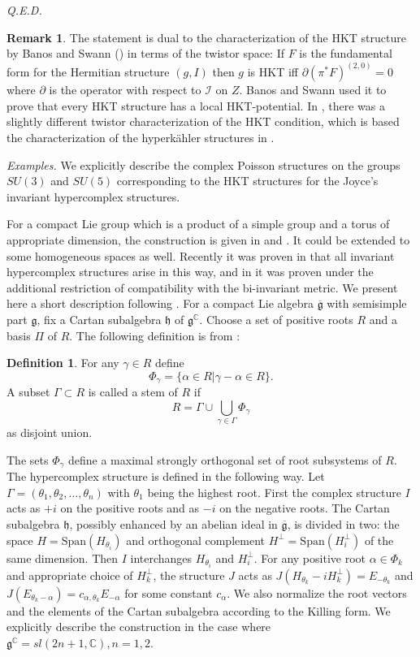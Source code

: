 \documentclass[11pt,oneside,leqno]{amsart}
\theoremstyle{plain}
\theoremstyle{definition}
\newtheorem{definition}[theorem]{Definition}
\newtheorem{rem}[theorem]{Remark}
\begin{document}
{\it Q.E.D.}

 \begin{rem} The statement is dual to the characterization of the HKT structure by Banos and Swann (\cite{BS}) in terms of the twistor space: If $F$ is the fundamental form for the Hermitian structure  $(g,I)$ then $g$ is HKT iff $\partial(\pi^*F)^{(2,0)} = 0$ where $\partial$ is the operator with respect to ${\mathcal I}$ on $Z$. Banos and Swann used it to prove that every HKT structure has a local HKT-potential. In \cite{GP}, there was a slightly different twistor characterization of the HKT condition, which is based the characterization of the hyperk\"ahler structures in \cite{HKLR}.
\end{rem}

 {\it Examples.} We explicitly describe the complex Poisson structures on the groups $SU(3)$ and $SU(5)$ corresponding to the HKT structures for the Joyce's invariant hypercomplex structures.

For a compact Lie group which is a product of a simple group and a torus of appropriate dimension, the construction is given in \cite{SSTV} and \cite{Joyce2}. It could be extended to some homogeneous spaces as well. Recently it was proven in \cite{VaskoGosho} that all invariant hypercomplex structures arise in this way, and in \cite{BGP} it was proven under the additional restriction of compatibility with the bi-invariant metric. We present here a short description following \cite{VaskoGosho}. For a compact Lie algebra $\overline{\mathfrak{g}}$ with semisimple part $\mathfrak{g}$, fix a Cartan subalgebra $\mathfrak{h}$ of $\mathfrak{g}^{\mathbb{C}}$. Choose a set of positive roots $R$ and a basis $\Pi$ of $R$.
The following definition is from \cite{VaskoGosho}:
\begin{definition}
For any $\gamma\in R$ define
$$\Phi_{\gamma} = \{\alpha\in R| \gamma-\alpha\in R \}.$$
A subset $\Gamma\subset R$ is called a stem of $R$ if
$$R = \Gamma\cup\bigcup_{\gamma\in\Gamma}\Phi_{\gamma}$$ as disjoint union.

\end{definition}

 The sets $\Phi_{\gamma}$ define a maximal strongly orthogonal set of root subsystems of $R$. The hypercomplex structure is defined in the following way. Let $\Gamma=(\theta_1,\theta_2,...,\theta_n)$ with $\theta_1$ being the highest root. First the complex structure $I$ acts as $+i$ on the positive roots and as $-i$ on the negative roots. The Cartan subalgebra $\mathfrak{h}$, possibly enhanced by an abelian ideal in $\overline{\mathfrak{g}}$, is divided in two: the space $ H = \text{Span}(H_{\theta_i})$ and orthogonal complement $H^{\bot}=\text{Span}(H^{\bot}_i)$ of the same dimension. Then $I$ interchanges $H_{\theta_i}$ and $H^{\bot}_i$. For any positive root $\alpha\in\Phi_k$ and appropriate choice of $H^{\bot}_k$, the structure $J$ acts as $J(H_{\theta_k}-iH^{\bot}_k) = E_{-\theta_k}$ and $J(E_{\theta_k-\alpha}) = c_{\alpha,\theta_k}E_{-\alpha}$  for some constant $c_{\alpha}$. We also normalize the root vectors and the elements of the Cartan subalgebra according to the Killing form. We explicitly describe the construction in the case where $\mathfrak{g}^{\mathbb{C}} = sl(2n+1, \mathbb{C}), n=1,2$.
\end{document}
